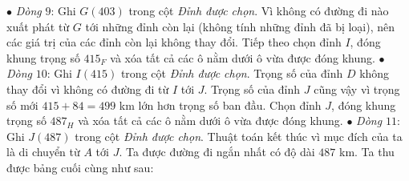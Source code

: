 \begin{multicols}{2}
	\vskip 0.1cm
	$\bullet$ \textit{Dòng} $9$: Ghi $G(403)$ trong cột \textit{Đỉnh được chọn}. Vì không có đường đi nào xuất phát từ $G$ tới những đỉnh còn lại (không tính những đỉnh đã bị loại), nên các giá trị của các đỉnh còn lại không thay đổi. Tiếp theo chọn đỉnh $I$, đóng khung trọng số $415_F$ và xóa tất cả các ô nằm dưới ô vừa được đóng khung. 
	\vskip 0.1cm
	$\bullet$ \textit{Dòng} $10$: Ghi $I(415)$ trong cột \textit{Đỉnh được chọn}. Trọng số của đỉnh $D$ không thay đổi vì không có đường đi từ $I$ tới $J$. Trọng số của đỉnh $J$ cũng vậy vì trọng số mới $415+84=499$ km lớn hơn trọng số ban đầu.  Chọn đỉnh $J$, đóng khung trọng số $487_H$ và xóa tất cả các ô nằm dưới ô vừa được đóng khung.
	\vskip 0.1cm 
	$\bullet$ \textit{Dòng $11$}: Ghi $J(487)$ trong cột \textit{Đỉnh được chọn}. Thuật toán kết thúc vì mục đích của ta là di chuyển từ $A$ tới $J$.  Ta được đường đi ngắn nhất có độ dài $487$ km. 
	\vskip 0.1cm
	Ta thu được bảng cuối cùng như sau:
	\begin{table}[H]
		\vspace*{-5pt}
		\centering
		\captionsetup{labelformat= empty, justification=centering}
\end{table}
\end{multicols}
